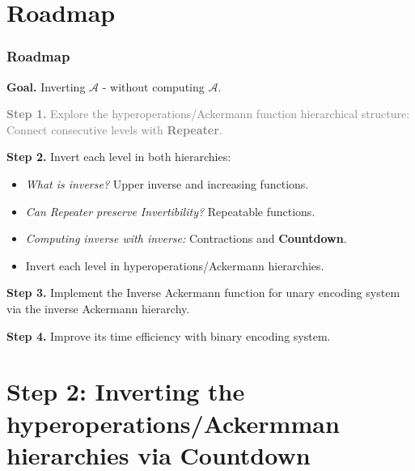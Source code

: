 \documentclass[10pt]{beamer}
\newcommand{\Ack}{\ensuremath{\mathcal{A}}}
\begin{document}
\section*{Roadmap}
\begin{frame}
\frametitle{Roadmap}
\textbf{Goal.} Inverting $\Ack$ - without computing $\Ack$.

\bigskip

\textcolor<1-2>{gray}{\textbf{Step 1.} Explore the hyperoperations/Ackermann function hierarchical structure: Connect consecutive levels with \textbf{Repeater}.}

\bigskip

{ \textbf{Step 2.} Invert each level in both hierarchies:
	{ \small
	\begin{itemize}\itemsep0em
		\color<2>{red}
		\item \emph{What is inverse?} Upper inverse and increasing functions.
		\item \emph{Can Repeater preserve Invertibility?} Repeatable functions.
		\item \emph{Computing inverse with inverse:} Contractions and \textbf{Countdown}.
		\item Invert each level in hyperoperations/Ackermann hierarchies.
	\end{itemize}
}
}

\bigskip

\textbf{Step 3.} Implement the Inverse Ackermann function for unary encoding system via the inverse Ackermann hierarchy.

\bigskip

\textbf{Step 4.} Improve its time efficiency with binary encoding system.
\end{frame}

\section{Step 2: Inverting the hyperoperations/Ackermman hierarchies via Countdown}
\label{sec: countdown}


%
\end{document}
